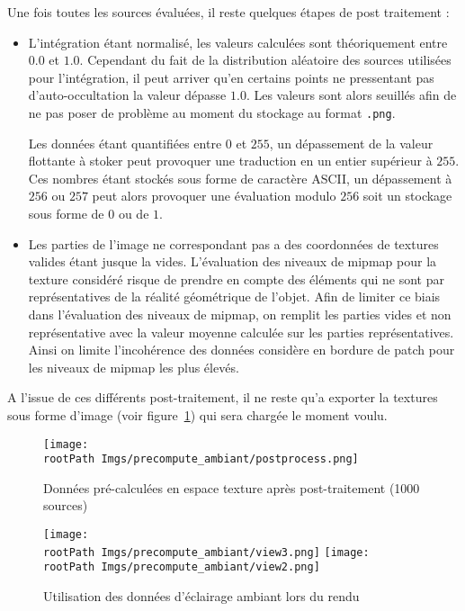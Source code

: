 \documentclass[10pt,a4paper,twoside, twocolumn]{report}
\newcommand*{\rootPath}{../}
\begin{document}
Une fois toutes les sources évaluées, il reste quelques étapes de post traitement :
\begin{itemize}
	\item L'intégration étant normalisé, les valeurs calculées sont théoriquement entre $0.0$ et $1.0$. Cependant du fait de la distribution aléatoire des sources utilisées pour l'intégration, il peut arriver qu'en certains points ne pressentant pas d'auto-occultation la valeur dépasse $1.0$. Les valeurs sont alors seuillés afin de ne pas poser de problème au moment du stockage au format \texttt{.png}.

	Les données étant quantifiées entre $0$ et $255$, un dépassement de la valeur flottante à stoker peut provoquer une traduction en un entier supérieur à $255$. Ces nombres étant stockés sous forme de caractère ASCII, un dépassement à $256$ ou $257$ peut alors provoquer une évaluation modulo $256$ soit un stockage sous forme de $0$ ou de $1$.

	\item Les parties de l'image ne correspondant pas a des coordonnées de textures valides étant jusque la vides. L'évaluation des niveaux de mipmap pour la texture considéré risque de prendre en compte des éléments qui ne sont par représentatives de la réalité géométrique de l'objet. Afin de limiter ce biais dans l'évaluation des niveaux de mipmap, on remplit les parties vides et non représentative avec la valeur moyenne calculée sur les parties représentatives. Ainsi on limite l’incohérence des données considère en bordure de patch pour les niveaux de mipmap les plus élevés.
\end{itemize}

A l'issue de ces différents post-traitement, il ne reste qu'a exporter la textures sous forme d'image (voir figure~\ref{fig:precompute_ambiant:postprocess}) qui sera chargée le moment voulu.

\begin{figure}[!ht]\centering
	\texttt{[image: \\rootPath Imgs/precompute\_ambiant/postprocess.png]}
	\caption{Données pré-calculées en espace texture après post-traitement (1000 sources)}
	\label{fig:precompute_ambiant:postprocess}
\end{figure}

\begin{figure}[!ht]\centering
	\texttt{[image: \\rootPath Imgs/precompute\_ambiant/view3.png]}
	\hspace{0.5cm}
	\texttt{[image: \\rootPath Imgs/precompute\_ambiant/view2.png]}
	\caption{Utilisation des données d'éclairage ambiant lors du rendu}
	\label{fig:precompute_ambiant:view}
\end{figure}
\end{document}
